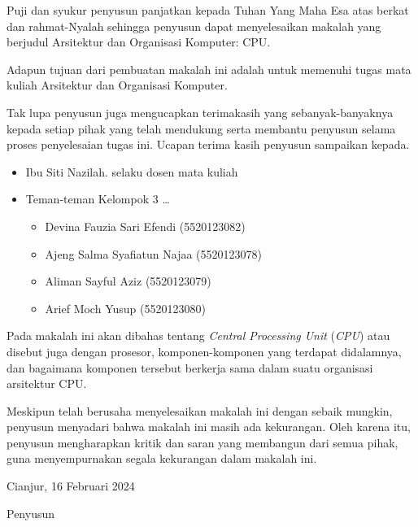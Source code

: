 Puji dan syukur penyusun panjatkan kepada Tuhan Yang Maha Esa atas berkat dan
rahmat-Nyalah sehingga penyusun dapat menyelesaikan makalah yang berjudul Arsitektur
dan Organisasi Komputer: CPU.

Adapun tujuan dari pembuatan makalah ini adalah untuk memenuhi tugas mata kuliah
Arsitektur dan Organisasi Komputer.

Tak lupa penyusun juga mengucapkan terimakasih yang sebanyak-banyaknya kepada
setiap pihak yang telah mendukung serta membantu penyusun selama proses penyelesaian
tugas ini. Ucapan terima kasih penyusun sampaikan kepada.

\begin{itemize}
  \item{Ibu Siti Nazilah. selaku dosen mata kuliah}
  \item{Teman-teman Kelompok 3} \dots{}
    \begin{itemize}
        \item Devina Fauzia Sari Efendi (5520123082)
        \item Ajeng Salma Syafiatun Najaa (5520123078)
        \item Aliman Sayful Aziz (5520123079)
        \item Arief Moch Yusup (5520123080)
    \end{itemize}
\end{itemize}

Pada makalah ini akan dibahas tentang \textit{Central Processing Unit} (\textit{CPU})
atau disebut juga dengan prosesor, komponen-komponen yang terdapat didalamnya,
dan bagaimana komponen tersebut berkerja sama dalam suatu organisasi arsitektur CPU.

Meskipun telah berusaha menyelesaikan makalah ini dengan sebaik mungkin,
penyusun menyadari bahwa makalah ini masih ada kekurangan. Oleh karena itu,
penyusun mengharapkan kritik dan saran yang membangun dari semua pihak,
guna menyempurnakan segala kekurangan dalam makalah ini.

\vspace{1cm}

\begin{center}
  \begin{flushright}
    Cianjur, 16 Februari 2024

    Penyusun
  \end{flushright}
\end{center}
